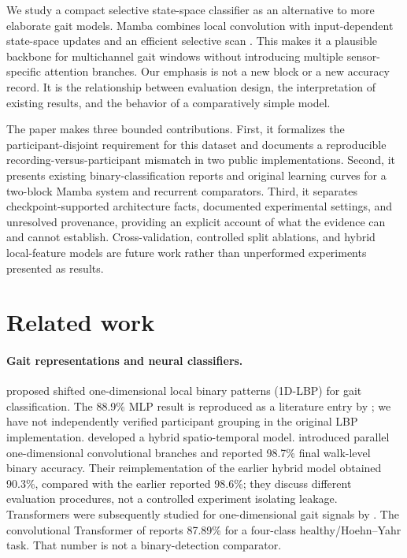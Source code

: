 We study a compact selective state-space classifier as an alternative to more elaborate gait models. Mamba combines local convolution with input-dependent state-space updates and an efficient selective scan \citep{gu2024}. This makes it a plausible backbone for multichannel gait windows without introducing multiple sensor-specific attention branches. Our emphasis is not a new block or a new accuracy record. It is the relationship between evaluation design, the interpretation of existing results, and the behavior of a comparatively simple model.

The paper makes three bounded contributions. First, it formalizes the participant-disjoint requirement for this dataset and documents a reproducible recording-versus-participant mismatch in two public implementations. Second, it presents existing binary-classification reports and original learning curves for a two-block Mamba system and recurrent comparators. Third, it separates checkpoint-supported architecture facts, documented experimental settings, and unresolved provenance, providing an explicit account of what the evidence can and cannot establish. Cross-validation, controlled split ablations, and hybrid local-feature models are future work rather than unperformed experiments presented as results.

\section{Related work}
\label{sec:related}
\paragraph{Gait representations and neural classifiers.}
\citet{ertugrul2016} proposed shifted one-dimensional local binary patterns (1D-LBP) for gait classification. The 88.9\% MLP result is reproduced as a literature entry by \citet{elmaachi2020}; we have not independently verified participant grouping in the original LBP implementation. \citet{zhao2018} developed a hybrid spatio-temporal model. \citet{elmaachi2020} introduced parallel one-dimensional convolutional branches and reported 98.7\% final walk-level binary accuracy. Their reimplementation of the earlier hybrid model obtained 90.3\%, compared with the earlier reported 98.6\%; they discuss different evaluation procedures, not a controlled experiment isolating leakage. Transformers were subsequently studied for one-dimensional gait signals by \citet{nguyen2022}. The convolutional Transformer of \citet{naimi2024} reports 87.89\% for a four-class healthy/Hoehn--Yahr task. That number is not a binary-detection comparator.

